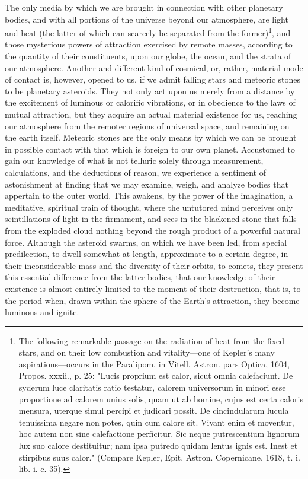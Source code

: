 The only media by which we are brought in connection with other planetary bodies, and with all portions of the universe beyond our atmosphere, are light and heat (the latter of which can scarcely be separated from the former)\footnote{The following remarkable passage on the radiation of heat from the fixed stars, and on their low combustion and vitality—one of Kepler's many aspirations—occurs in the Paralipom. in Vitell. Astron. pars Optica, 1604, Propos. xxxii., p. 25: "Lucis proprium est calor, sicut omnia calefaciunt. De syderum luce claritatis ratio testatur, calorem universorum in minori esse proportione ad calorem unius solis, quam ut ab homine, cujus est certa caloris mensura, uterque simul percipi et judicari possit. De cincindularum lucula tenuissima negare non potes, quin cum calore sit. Vivant enim et moventur, hoc autem non sine calefactione perficitur. Sic neque putrescentium lignorum lux suo calore destituitur; nam ipsa putredo quidam lentus ignis est. Inest et stirpibus suus calor." (Compare Kepler, Epit. Astron. Copernicane, 1618, t. i. lib. i. c. 35).}, and those mysterious powers of attraction exercised by remote masses, according to the quantity of their constituents, upon our globe, the ocean, and the strata of our atmosphere. Another and different kind of cosmical, or, rather, material mode of contact is, however, opened to us, if we admit falling stars and meteoric stones to be planetary asteroids. They not only act upon us merely from a distance by the excitement of luminous or calorific vibrations, or in obedience to the laws of mutual attraction, but they acquire an actual material existence for us, reaching our atmosphere from the remoter regions of universal space, and remaining on the earth itself. Meteoric stones are the only means by which we can be brought in possible contact with that which is foreign to our own planet. Accustomed to gain our knowledge of what is not telluric solely through measurement, calculations, and the deductions of reason, we experience a sentiment of astonishment at finding that we may examine, weigh, and analyze bodies that appertain to the outer world. This awakens, by the power of the imagination, a meditative, spiritual train of thought, where the untutored mind perceives only scintillations of light in the firmament, and sees in the blackened stone that falls from the exploded cloud nothing beyond the rough product of a powerful natural force. Although the asteroid swarms, on which we have been led, from special predilection, to dwell somewhat at length, approximate to a certain degree, in their inconsiderable mass and the diversity of their orbits, to comets, they present this essential difference from the latter bodies, that our knowledge of their existence is almost entirely limited to the moment of their destruction, that is, to the period when, drawn within the sphere of the Earth's attraction, they become luminous and ignite.
